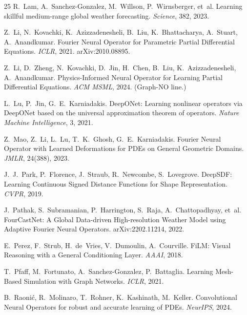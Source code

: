 \documentclass[11pt]{article}
\theoremstyle{definition}
\begin{document}
\begin{thebibliography}{25}
R.~Lam, A.~Sanchez-Gonzalez, M.~Willson, P.~Wirnsberger, et~al.
\newblock Learning skillful medium-range global weather forecasting.
\newblock \emph{Science}, 382, 2023.

Z.~Li, N.~Kovachki, K.~Azizzadenesheli, B.~Liu, K.~Bhattacharya, A.~Stuart,
A.~Anandkumar.
\newblock Fourier Neural Operator for Parametric Partial Differential
Equations.
\newblock \emph{ICLR}, 2021. arXiv:2010.08895.

Z.~Li, D.~Zheng, N.~Kovachki, D.~Jin, H.~Chen, B.~Liu, K.~Azizzadenesheli,
A.~Anandkumar.
\newblock Physics-Informed Neural Operator for Learning Partial Differential
Equations.
\newblock \emph{ACM MSML}, 2024. (Graph-NO line.)

L.~Lu, P.~Jin, G.~E.~Karniadakis.
\newblock DeepONet: Learning nonlinear operators via DeepONet based on the
universal approximation theorem of operators.
\newblock \emph{Nature Machine Intelligence}, 3, 2021.

Z.~Mao, Z.~Li, L.~Lu, T.~K.~Ghosh, G.~E.~Karniadakis.
\newblock Fourier Neural Operator with Learned Deformations for PDEs on
General Geometric Domains.
\newblock \emph{JMLR}, 24(388), 2023.

J.~J.~Park, P.~Florence, J.~Straub, R.~Newcombe, S.~Lovegrove.
\newblock DeepSDF: Learning Continuous Signed Distance Functions for Shape
Representation.
\newblock \emph{CVPR}, 2019.

J.~Pathak, S.~Subramanian, P.~Harrington, S.~Raja, A.~Chattopadhyay, et~al.
\newblock FourCastNet: A Global Data-driven High-resolution Weather Model
using Adaptive Fourier Neural Operators.
\newblock arXiv:2202.11214, 2022.

E.~Perez, F.~Strub, H.~de~Vries, V.~Dumoulin, A.~Courville.
\newblock FiLM: Visual Reasoning with a General Conditioning Layer.
\newblock \emph{AAAI}, 2018.

T.~Pfaff, M.~Fortunato, A.~Sanchez-Gonzalez, P.~Battaglia.
\newblock Learning Mesh-Based Simulation with Graph Networks.
\newblock \emph{ICLR}, 2021.

B.~Raoni{\'c}, R.~Molinaro, T.~Rohner, K.~Kashinath, M.~Keller.
\newblock Convolutional Neural Operators for robust and accurate learning of
PDEs.
\newblock \emph{NeurIPS}, 2024.


\end{thebibliography}
\end{document}
